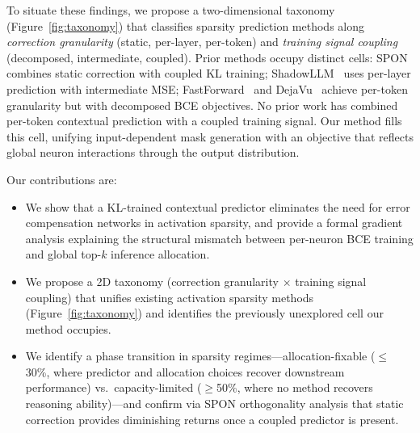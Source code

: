 To situate these findings, we propose a two-dimensional taxonomy (Figure~\ref{fig:taxonomy}) that classifies sparsity prediction methods along \emph{correction granularity} (static, per-layer, per-token) and \emph{training signal coupling} (decomposed, intermediate, coupled).
Prior methods occupy distinct cells: SPON~\cite{xu2026spon} combines static correction with coupled KL training; ShadowLLM~\cite{akhauri2024shadowllm} uses per-layer prediction with intermediate MSE; FastForward~\cite{gautam2026fastforward} and DejaVu~\cite{liu2023dejavu} achieve per-token granularity but with decomposed BCE objectives.
No prior work has combined per-token contextual prediction with a coupled training signal.
Our method fills this cell, unifying input-dependent mask generation with an objective that reflects global neuron interactions through the output distribution.

Our contributions are:
\begin{itemize}[nosep,leftmargin=*]
\item We show that a KL-trained contextual predictor eliminates the need for error compensation networks in activation sparsity, and provide a formal gradient analysis explaining the structural mismatch between per-neuron BCE training and global top-$k$ inference allocation.
\item We propose a 2D taxonomy (correction granularity $\times$ training signal coupling) that unifies existing activation sparsity methods (Figure~\ref{fig:taxonomy}) and identifies the previously unexplored cell our method occupies.
\item We identify a phase transition in sparsity regimes---allocation-fixable ($\leq$30\%, where predictor and allocation choices recover downstream performance) vs.\ capacity-limited ($\geq$50\%, where no method recovers reasoning ability)---and confirm via SPON orthogonality analysis that static correction provides diminishing returns once a coupled predictor is present.
\end{itemize}
